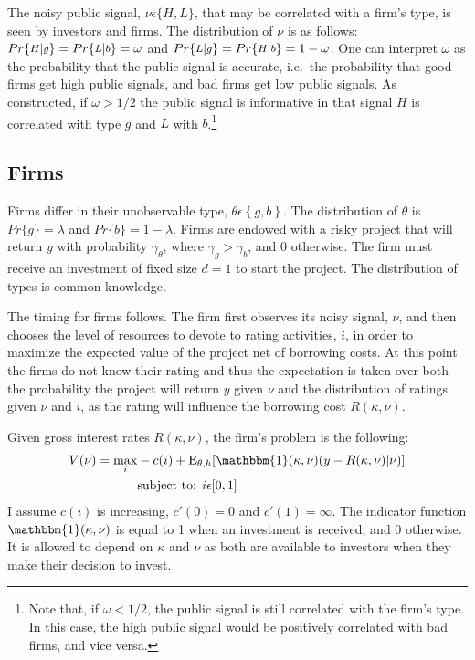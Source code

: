 \documentclass[notitlepage]{article}
\begin{document}
The noisy public signal, $\nu\epsilon \{H,L\}$, that may be correlated with a firm's type, is seen by investors and firms. The distribution of $\nu$ is as follows: $Pr \{\medmath{H} | \medmath{g} \}=Pr \{\medmath{L} | \medmath{b} \}=\omega$ and $Pr \{\medmath{L} | \medmath{g} \}=Pr \{\medmath{H} | \medmath{b} \}=1-\omega$. One can interpret $\omega$ as the probability that the public signal is accurate, i.e.\ the probability that good firms get high public signals, and bad firms get low public signals. As constructed, if $\omega > 1/2$ the public signal is informative in that signal $H$ is correlated with type $g$ and $L$ with $b$.\footnote{Note that, if $\omega<1/2$, the public signal is still correlated with the firm's type. In this case, the high public signal would be positively correlated with bad firms, and vice versa.}

\subsection{Firms}
Firms differ in their unobservable type, $\theta \epsilon \left\{g,b\right\}$. The distribution of $\theta$ is $Pr\{g\}=\lambda$ and $Pr\{b\}=1-\lambda$. Firms are endowed with a risky project that will return $y$ with probability $\gamma_{\theta}$, where $\gamma_{g}>\gamma_{b}$, and 0 otherwise. The firm must receive an investment of fixed size $d=1$ to start the project. The distribution of types is common knowledge. 

The timing for firms follows. The firm first observes its noisy signal, $\nu$, and then chooses the level of resources to devote to rating activities, $i$, in order to maximize the expected value of the project net of borrowing costs. At this point the firms do not know their rating and thus the expectation is taken over both the probability the project will return $y$ given $\nu$ and the distribution of ratings given $\nu$ and $i$, as the rating will influence the borrowing cost $R(\kappa,\nu)$.

Given gross interest rates $R(\kappa,\nu)$, the firm's problem is the following:
\begin{align}
\label{eq:FP} V(\nu)=\max_{i} & -c(i)+\textup{E}_{\theta,h} [ \mathbbm{1}(\kappa,\nu) (y - R(\kappa,\nu)|\nu ) ]\\
& \textup{subject to: } i\epsilon [0,1] \nonumber
\end{align}
I assume $c(i)$ is increasing, $c'(0)=0$ and $c'(1)=\infty$. The indicator function $\mathbbm{1}(\kappa,\nu)$ is equal to 1 when an investment is received, and 0 otherwise. It is allowed to depend on $\kappa$ and $\nu$ as both are available to investors when they make their decision to invest.
\end{document}
